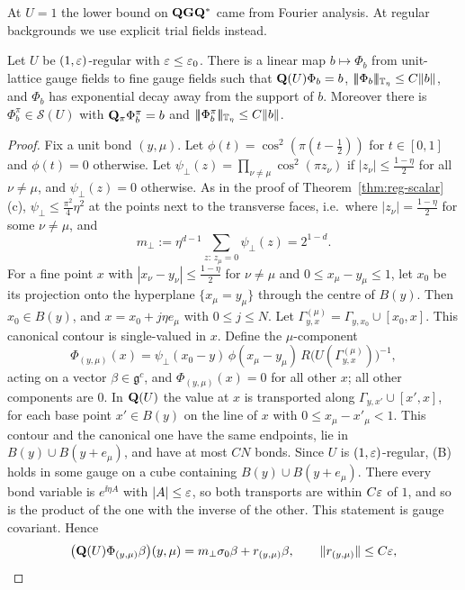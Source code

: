 At $U=1$ the lower bound on $\mathbf Q\mathbf G\mathbf Q^*$ came from Fourier analysis. At regular backgrounds we use explicit trial fields instead.

\begin{lemma}\label{lem:trial-gauge}
Let $U$ be $(1,\varepsilon)$-regular with $\varepsilon\le\varepsilon_0$. There is a linear map $b\mapsto\Phi_b$ from unit-lattice gauge fields to fine gauge fields such that $\mathbf Q(U)\Phi_b=b$, $|\!|\!|\Phi_b|\!|\!|_{\mathbb T_\eta}\le C\|b\|$, and $\Phi_b$ has exponential decay away from the support of $b$. Moreover there is $\Phi^\pi_b\in\mathcal S(U)$ with $\mathbf Q_\pi\Phi^\pi_b=b$ and $|\!|\!|\Phi^\pi_b|\!|\!|_{\mathbb T_\eta}\le C\|b\|$.
\end{lemma}

\begin{proof}
Fix a unit bond $(y,\mu)$. Let $\phi(t)=\cos^2(\pi(t-\frac12))$ for $t\in[0,1]$ and $\phi(t)=0$ otherwise. Let $\psi_\perp(z)=\prod_{\nu\ne\mu}\cos^2(\pi z_\nu)$ if $|z_\nu|\le\frac{1-\eta}2$ for all $\nu\ne\mu$, and $\psi_\perp(z)=0$ otherwise. As in the proof of Theorem~\ref{thm:reg-scalar}(c), $\psi_\perp\le\frac{\pi^2}4\eta^2$ at the points next to the transverse faces, i.e.\ where $|z_\nu|=\frac{1-\eta}2$ for some $\nu\ne\mu$, and
\[
m_\perp:=\eta^{d-1}\sum_{z:\,z_\mu=0}\psi_\perp(z)=2^{1-d}.
\]
For a fine point $x$ with $|x_\nu-y_\nu|\le\frac{1-\eta}2$ for $\nu\ne\mu$ and $0\le x_\mu-y_\mu\le1$, let $x_0$ be its projection onto the hyperplane $\{x_\mu=y_\mu\}$ through the centre of $B(y)$. Then $x_0\in B(y)$, and $x=x_0+j\eta e_\mu$ with $0\le j\le N$. Let $\Gamma^{(\mu)}_{y,x}=\Gamma_{y,x_0}\cup[x_0,x]$. This canonical contour is single-valued in $x$. Define the $\mu$-component
\[
\Phi_{(y,\mu)}(x)=\psi_\perp(x_0-y)\,\phi(x_\mu-y_\mu)\,R\big(U(\Gamma^{(\mu)}_{y,x})\big)^{-1},
\]
acting on a vector $\beta\in\mathfrak g^c$, and $\Phi_{(y,\mu)}(x)=0$ for all other $x$; all other components are $0$. In $\mathbf Q(U)$ the value at $x$ is transported along $\Gamma_{y,x'}\cup[x',x]$, for each base point $x'\in B(y)$ on the line of $x$ with $0\le x_\mu-x'_\mu<1$. This contour and the canonical one have the same endpoints, lie in $B(y)\cup B(y+e_\mu)$, and have at most $CN$ bonds. Since $U$ is $(1,\varepsilon)$-regular, (B) holds in some gauge on a cube containing $B(y)\cup B(y+e_\mu)$. There every bond variable is $e^{\ii\eta A}$ with $|A|\le\varepsilon$, so both transports are within $C\varepsilon$ of $1$, and so is the product of the one with the inverse of the other. This statement is gauge covariant. Hence
\[
\big(\mathbf Q(U)\Phi_{(y,\mu)}\beta\big)(y,\mu)=m_\perp\sigma_0\beta+r_{(y,\mu)}\beta,\qquad\|r_{(y,\mu)}\|\le C\varepsilon,
\]
\end{proof}
